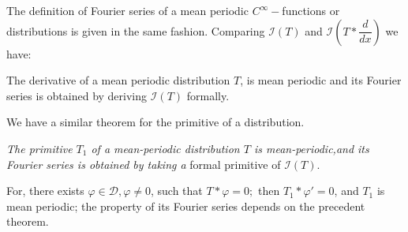 The definition of Fourier series of a mean periodic
$C^\infty-$functions or distributions is given in the same
fashion. Comparing $\mathscr{I}(T)$ and $\mathscr{I}(T *
\dfrac{d}{dx})$ we have: 
\begin{theorem*}%
  The derivative of a mean periodic distribution $T$, is mean periodic
  and its Fourier series is obtained by deriving $\mathscr{I}(T)$
  formally. 
\end{theorem*}

We have a similar theorem for the primitive of a distribution.

\textit{The primitive $T_1$ of a mean-periodic distribution $T$ is
 mean-periodic,\pageoriginale and its Fourier series is obtained by taking a}
formal primitive of $\mathscr{I}(T)$. 

For, there exists $\varphi \in \mathscr{D}, \varphi \neq 0$, such that
$T * \varphi =0;$ then $T_1 * \varphi' = 0$, and $T_1$ is mean
periodic; the property of its Fourier series depends on the precedent
theorem. 
